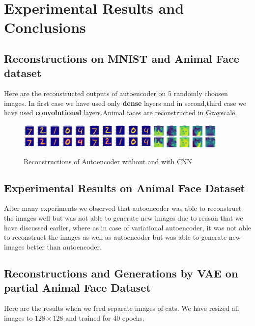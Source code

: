 \documentclass[10pt,a4paper]{article}
\begin{document}
\section{Experimental Results and Conclusions}
\subsection*{Reconstructions on MNIST and Animal Face dataset} Here are the reconstructed outputs of autoencoder on 5 randomly choosen images. In first case we have used only \textbf{dense} layers and in second,third case we have used \textbf{convolutional} layers.Animal faces are reconstructed in Grayscale.

\begin{figure}[h]
    \centering
    \includegraphics[width=0.3\textwidth]{autoencoder1.png}
    \includegraphics[width=0.3\textwidth]{autoencoder2.png}
    \includegraphics[width=0.3\textwidth]{animalFaceAE1.png}
    \caption{Reconstructions of Autoencoder without and with CNN}
    \label{fig:my_label}
\end{figure}

\subsection*{Experimental Results on Animal Face Dataset}
After many experiments we observed that autoencoder was able to reconstruct the images well but was not able to generate new images due to reason that we have discussed earlier, where as in case of variational autoencoder, it was not able to reconstruct the images as well as autoencoder but was able to generate new images better than autoencoder. 

\subsection*{Reconstructions and Generations by VAE on partial Animal Face Dataset} Here are the results when we feed separate images of cats. We have resized all images to $128 \times 128$ and trained for 40 epochs. 
\end{document}
